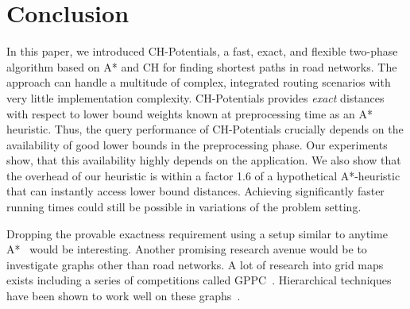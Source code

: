 \documentclass[a4paper,UKenglish,cleveref, autoref, thm-restate]{lipics-v2021}
\begin{document}
\section{Conclusion}
\label{sec:conclusion}

In this paper, we introduced CH-Potentials, a fast, exact, and flexible two-phase algorithm based on A* and CH for finding shortest paths in road networks.
The approach can handle a multitude of complex, integrated routing scenarios with very little implementation complexity.
CH-Potentials provides \emph{exact} distances with respect to lower bound weights known at preprocessing time as an A* heuristic.
Thus, the query performance of CH-Potentials crucially depends on the availability of good lower bounds in the preprocessing phase.
Our experiments show, that this availability highly depends on the application.
We also show that the overhead of our heuristic is within a factor 1.6 of a hypothetical A*-heuristic that can instantly access lower bound distances.
Achieving significantly faster running times could still be possible in variations of the problem setting.

Dropping the provable exactness requirement using a setup similar to anytime A*~\cite{DBLP:conf/aaai/ZhouH02,DBLP:conf/nips/LikhachevGT03} would be interesting.
Another promising research avenue would be to investigate graphs other than road networks.
A lot of research into grid maps exists including a series of competitions called GPPC~\cite{DBLP:conf/socs/SturtevantTTUKS15}.
Hierarchical techniques have been shown to work well on these graphs~\cite{DBLP:conf/aaai/UrasK14}.




\end{document}
